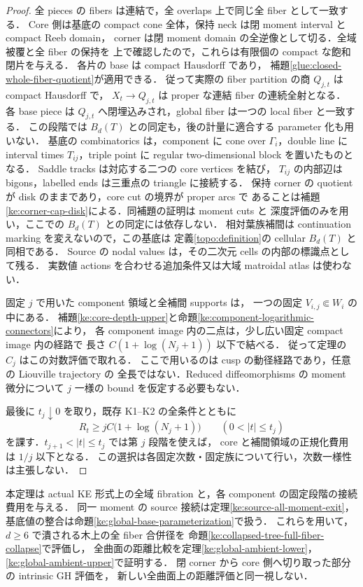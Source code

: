 \begin{proof}
全 pieces の fibers は連結で，全 overlaps 上で同じ全 fiber として一致する．
Core 側は基底の compact cone 全体，保持 neck は閉 moment interval と compact Reeb domain，
corner は閉 moment domain の全逆像として切る．全域被覆と全 fiber の保持を
上で確認したので，これらは有限個の compact な飽和閉片を与える．
各片の base は compact Hausdorff であり，
補題\ref{glue:closed-whole-fiber-quotient}が適用できる．
従って実際の fiber partition の商 $Q_{j,t}$ は compact Hausdorff で，
$X_t\to Q_{j,t}$ は proper な連結 fiber の連続全射となる．
各 base piece は $Q_{j,t}$ へ閉埋込みされ，global fiber は一つの local fiber と一致する．
この段階では $B_d(T)$ との同定も，後の計量に適合する parameter 化も用いない．
基底の combinatorics は，component に cone over $\Gamma_i$，double line に
interval times $T_{ij}$，triple point に regular two-dimensional block を置いたものとなる．
Saddle tracks は対応する二つの core vertices を結び，
$T_{ij}$ の内部辺は bigons，labelled ends は三重点の triangle に接続する．
保持 corner の quotient が disk のままであり，core cut の境界が proper arcs で
あることは補題\ref{ke:corner-cap-disk}による．同補題の証明は moment cuts と
深度評価のみを用い，ここでの $B_d(T)$ との同定には依存しない．
相対葉族補間は continuation marking を変えないので，この基底は
定義\ref{topo:definition}の cellular $B_d(T)$ と同相である．
Source の nodal values は，その二次元 cells の内部の標識点として残る．
実数値 actions を合わせる追加条件又は大域 matroidal atlas は使わない．

固定 $j$ で用いた component 領域と全補間 supports は，
一つの固定 $V_{i,j}\Subset W_i$ の中にある．
補題\ref{ke:core-depth-upper}と命題\ref{ke:component-logarithmic-connectors}により，
各 component image 内の二点は，少し広い固定 compact image 内の経路で
長さ $C(1+\log(N_j+1))$ 以下で結べる．
従って定理の $C_j$ はこの対数評価で取れる．
ここで用いるのは cusp の動径経路であり，任意の Liouville trajectory の
全長ではない．Reduced diffeomorphisms の moment 微分について
$j$ 一様の bound を仮定する必要もない．

最後に $t_j\downarrow0$ を取り，既存 K1--K2 の全条件とともに
\[
 R_t\ge jC\bigl(1+\log(N_j+1)\bigr)
 \qquad(0<|t|\le t_j)
\]
を課す．$t_{j+1}<|t|\le t_j$ では第 $j$ 段階を使えば，
core と補間領域の正規化費用は $1/j$ 以下となる．
この選択は各固定次数・固定族について行い，次数一様性は主張しない．
\end{proof}

本定理は actual KE 形式上の全域 fibration と，各 component の固定段階の接続費用を与える．
同一 moment の source 接続は定理\ref{ke:source-all-moment-exit}，
基底値の整合は命題\ref{ke:global-base-parameterization}で扱う．
これらを用いて，$d\ge6$ で潰される木上の全 fiber 合併径を
命題\ref{ke:collapsed-tree-full-fiber-collapse}で評価し，
全曲面の距離比較を定理\ref{ke:global-ambient-lower}，
\ref{ke:global-ambient-upper}で証明する．
閉 corner から core 側へ切り取った部分の intrinsic GH 評価を，
新しい全曲面上の距離評価と同一視しない．

